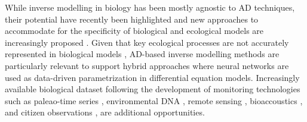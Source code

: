 While inverse modelling in biology has been mostly agnostic to AD techniques, their potential have recently been highlighted \cite{frank2022,alsos2023} and new approaches to accommodate for the specificity of biological and ecological models are increasingly proposed \cite{Yazdani2020,Boussange2022a,paredes2023}. 
Given that key ecological processes are not accurately represented in biological models \cite{hartig2012,Schartau2017,chalmandrier2021}, AD-based inverse modelling methods are particularly relevant to support hybrid approaches where neural networks are used as data-driven parametrization \cite{rasp2018,Boussange2022a} in differential equation models.
Increasingly available biological dataset following the development of monitoring technologies such as paleao-time series \cite{alsos2023}, environmental DNA \cite{Ruppert2019}, remote sensing \cite{Jetz2019}, bioaccoustics \cite{Aide2013}, and citizen observations \cite{GBIF}, are additional opportunities.